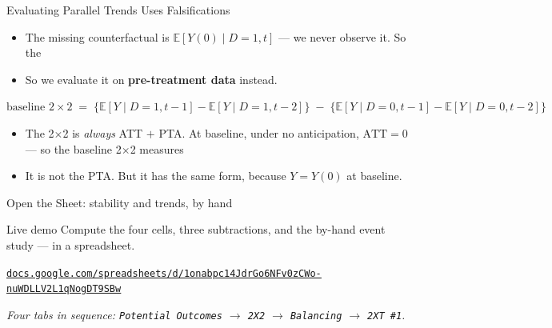 \documentclass[aspectratio=169,11pt]{beamer}
\begin{document}
\begin{frame}{Evaluating Parallel Trends Uses Falsifications}
\vspace{-0.1em}
\footnotesize
\begin{itemize}\setlength\itemsep{0.45em}
  \item The missing counterfactual is $\mathbb{E}[Y(0)\mid D{=}1,t]$ --- we never observe it. \;So the 
  \item So we evaluate it on \textbf{pre-treatment data} instead.
\end{itemize}
\vspace{0.2em}
\begin{center}
$\text{baseline }2\times2 \;=\; \big\{\mathbb{E}[Y\mid D{=}1,t{-}1] - \mathbb{E}[Y\mid D{=}1,t{-}2]\big\}
 \;-\; \big\{\mathbb{E}[Y\mid D{=}0,t{-}1] - \mathbb{E}[Y\mid D{=}0,t{-}2]\big\}$
\end{center}
\vspace{0.2em}
\begin{itemize}\setlength\itemsep{0.45em}
  \item The 2$\times$2 is \textit{always} ATT $+$ PTA. \;At baseline, under no anticipation, $\text{ATT}=0$ --- so the baseline 2$\times$2 measures 
  \item It is not the PTA. \;But it has the same form, because $Y = Y(0)$ at baseline.
\end{itemize}
\vspace{0.2em}
\end{frame}


\begin{frame}{Open the Sheet: stability and trends, by hand}
\vspace{0.6em}
\begin{block}{Live demo}
Compute the four cells, three subtractions, and the by-hand event study --- in a spreadsheet.
\end{block}
\vspace{1em}
\begin{center}
\href{https://docs.google.com/spreadsheets/d/1onabpc14JdrGo6NFv0zCWo-nuWDLLV2L1qNogDT9SBw/edit?usp=sharing}{\color{ocean}\underline{\small\texttt{docs.google.com/spreadsheets/d/1onabpc14JdrGo6NFv0zCWo-nuWDLLV2L1qNogDT9SBw}}}
\end{center}
\vspace{1em}
\begin{center}
\small\color{warmgray}\itshape
Four tabs in sequence: \texttt{Potential Outcomes} $\rightarrow$ \texttt{2X2} $\rightarrow$ \texttt{Balancing} $\rightarrow$ \texttt{2XT \#1}.
\end{center}
\end{frame}
\end{document}
